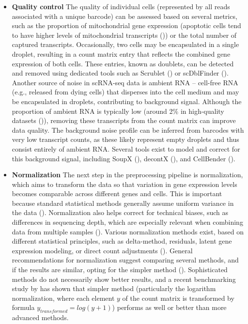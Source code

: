 \begin{itemize}
  \item \textbf{Quality control}
The quality of individual cells (represented by all reads associated with a unique barcode)
can be assessed based on several metrics, 
such as the proportion of mitochondrial gene expression (apoptotic cells tend to have higher levels of mitochondrial
transcripts (\cite{Heumos2023})) or the total number of captured transcripts.
Occasionally, two cells may be encapsulated in a single droplet,
resulting in a count matrix entry that reflects the combined gene expression of both cells.
These entries, known as doublets, can be detected and removed
using dedicated tools such as Scrublet (\cite{Wolock2019}) or scDblFinder (\cite{Germain2022}).
Another source of noise in scRNA-seq data is ambient RNA – cell-free RNA (e.g., released from dying cells)
that disperses into the cell medium and may be encapsulated in droplets, contributing to background signal.
Although the proportion of ambient RNA is typically low (around 2\% in high-quality datasets (\cite{Young2020})),
removing these transcripts from the count matrix can improve data quality.
The background noise profile can be inferred from barcodes with very low transcript counts,
as these likely represent empty droplets and thus consist entirely of ambient RNA.
Several tools exist to model and correct for this background signal,
including SoupX (\cite{Young2020}), decontX (\cite{Yang2020}), and CellBender (\cite{Fleming2023}).

  \item \textbf{Normalization}
The next step in the preprocessing pipeline is normalization,
which aims to transform the data so that variation in gene expression levels becomes comparable across different genes and cells.
This is important because standard statistical methods generally assume uniform variance in the data (\cite{Ahlmann2023}).
Normalization also helps correct for technical biases, such as differences in sequencing depth, which are especially
relevant when combining data from multiple samples (\cite{Lingen2024}).
Various normalization methods exist, based on different statistical principles, 
such as delta-method, residuals, latent gene expression modeling, or direct count adjustments (\cite{Ahlmann2023}).
General recommendations for normalization suggest comparing several methods,
and if the results are similar, opting for the simpler method (\cite{Lingen2024}).
Sophisticated methods do not necessarily show better results, and a recent benchmarking study by \textcite{Ahlmann2023}
has shown that simpler method (particularly the logarithm normalization,
where each element $y$ of the count matrix is transformed by formula $y_{transformed} = log(y+1)$)
performs as well or better than more advanced methods.


\end{itemize}
